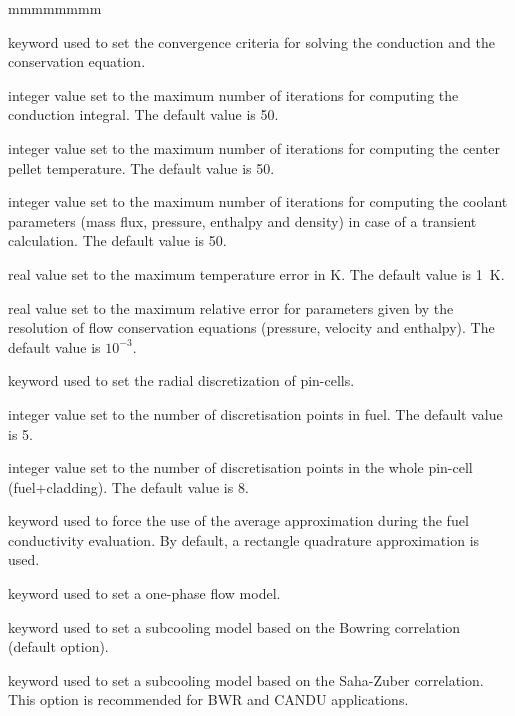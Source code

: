 \begin{ListeDeDescription}{mmmmmmmm}
\item[\moc{CONV}] keyword used to set the convergence criteria for solving the conduction and the conservation equation.

\item[\dusa{maxit1}] integer value set to the maximum number of iterations for computing the
conduction integral. The default value is 50.

\item[\dusa{maxit2}] integer value set to the maximum number of iterations for computing the
center pellet temperature. The default value is 50.

\item[\dusa{maxit3}] integer value set to the maximum number of iterations for computing the
coolant parameters (mass flux, pressure, enthalpy and density) in case of a transient calculation. The default value is 50.

\item[\dusa{ermaxt}] real value set to the maximum temperature error in K. The default value is 1~K.

\item[\dusa{ermaxc}] real value set to the maximum relative  error for parameters given by the resolution of flow conservation equations (pressure, velocity and enthalpy). The default value is $10^{-3}$.

\item[\moc{RODMESH}] keyword used to set the radial discretization of pin-cells.

\item[\dusa{nb1}] integer value set to the number of discretisation points in fuel. The default value
is 5.

\item[\dusa{nb2}] integer value set to the number of discretisation points in the whole pin-cell (fuel+cladding). The default value
is 8.

\item[\moc{FORCEAVE}] keyword used to force the use of the average approximation during the fuel conductivity evaluation.
By default, a rectangle quadrature approximation is used.

\item[\moc{MONO}] keyword used to set a one-phase flow model.

\item[\moc{BOWR}] keyword used to set a subcooling model based on the Bowring correlation\cite{bowring} (default option).

\item[\moc{SAHA}] keyword used to set a subcooling model based on the Saha-Zuber correlation\cite{lahey}. This option is recommended for BWR and CANDU applications.


\end{ListeDeDescription}
